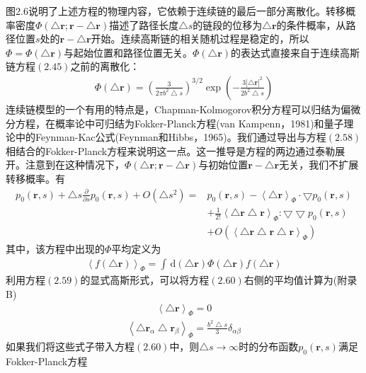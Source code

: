 图2.6说明了上述方程的物理内容，它依赖于连续链的最后一部分离散化。转移概率密度$\Phi(\bigtriangleup \mathbf{r};\mathbf{r}-\bigtriangleup \mathbf{r})$描述了路径长度$\bigtriangleup s$的链段的位移为$\bigtriangleup \mathbf{r}$的条件概率，从路径位置$s$处的$\mathbf{r}-\bigtriangleup \mathbf{r}$开始。连续高斯链的相关随机过程是稳定的，所以$\Phi =\Phi(\bigtriangleup \mathbf{r})$与起始位置和路径位置无关。$\Phi(\bigtriangleup \mathbf{r})$的表达式直接来自于连续高斯链方程$(2.45)$之前的离散化：
\begin{gather}
\Phi(\bigtriangleup \mathbf{r})=\left( \frac{3}{2\pi b^2 \bigtriangleup s} \right)^{3/2}\exp \left(- \frac{3\left| \bigtriangleup \mathbf{r} \right|^2}{2b^2 \bigtriangleup s} \right)
\end{gather}
连续链模型的一个有用的特点是，Chapman-Kolmogorov积分方程可以归结为偏微分方程，在概率论中可归结为Fokker-Planck方程(van Kampenn，1981)和量子理论中的Feynman-Kac公式(Feynman和Hibbs，1965)。我们通过导出与方程$(2.58)$相结合的Fokker-Planck方程来说明这一点。这一推导是方程的两边通过泰勒展开。注意到在这种情况下，$\Phi(\bigtriangleup \mathbf{r};\mathbf{r}-\bigtriangleup \mathbf{r})$与初始位置$\mathbf{r}-\bigtriangleup \mathbf{r}$无关，我们不扩展转移概率。有
\begin{equation}
\begin{aligned}
p_0(\mathbf{r},s)+\bigtriangleup s\frac{\partial}{\partial s}p_0(\mathbf{r},s)+O(\bigtriangleup s^2)=&p_0(\mathbf{r},s)-\left \langle \bigtriangleup \mathbf{r} \right \rangle _\Phi \cdot \bigtriangledown p_0 (\mathbf{r},s)\\ &+\frac{1}{2!}\left \langle \bigtriangleup \mathbf{r}  \bigtriangleup \mathbf{r} \right \rangle _\Phi:\bigtriangledown \bigtriangledown p_0(\mathbf{r},s)\\ &+O(\left \langle \bigtriangleup \mathbf{r}  \bigtriangleup \mathbf{r}  \bigtriangleup \mathbf{r} \right \rangle _\Phi)
\end{aligned}
\end{equation}
其中，该方程中出现的$\Phi$平均定义为
\begin{gather}
\left \langle f(\bigtriangleup \mathbf{r}) \right \rangle _\Phi = \int \, \mathrm{d}(\bigtriangleup \mathbf{r})\Phi (\bigtriangleup \mathbf{r})f(\bigtriangleup \mathbf{r})
\end{gather}
利用方程$(2.59)$的显式高斯形式，可以将方程$(2.60)$右侧的平均值计算为(附录B)
\begin{gather}
\left \langle \bigtriangleup \mathbf{r} \right \rangle _\Phi = 0
\end{gather}
\begin{gather}
\left \langle \bigtriangleup \mathbf{r}_\alpha \bigtriangleup \mathbf{r}_\beta \right \rangle _\Phi = \frac{b^2 \bigtriangleup s}{3}\delta_{\alpha \beta}
\end{gather}
如果我们将这些式子带入方程$(2.60)$中，则$\bigtriangleup s \rightarrow \infty$时的分布函数$p_0(\mathbf{r},s)$满足Fokker-Planck方程

